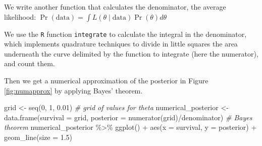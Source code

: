 \documentclass[
  12pt,
]{krantz}
\newenvironment{Shaded}{\begin{snugshade}}{\end{snugshade}}
\newcommand{\AttributeTok}[1]{\textcolor[rgb]{0.77,0.63,0.00}{#1}}
\newcommand{\CommentTok}[1]{\textcolor[rgb]{0.56,0.35,0.01}{\textit{#1}}}
\newcommand{\DecValTok}[1]{\textcolor[rgb]{0.00,0.00,0.81}{#1}}
\newcommand{\FloatTok}[1]{\textcolor[rgb]{0.00,0.00,0.81}{#1}}
\newcommand{\FunctionTok}[1]{\textcolor[rgb]{0.00,0.00,0.00}{#1}}
\newcommand{\NormalTok}[1]{#1}
\newcommand{\OtherTok}[1]{\textcolor[rgb]{0.56,0.35,0.01}{#1}}
\newcommand{\SpecialCharTok}[1]{\textcolor[rgb]{0.00,0.00,0.00}{#1}}
\begin{document}
We write another function that calculates the denominator, the average likelihood: \(\Pr(\text{data}) = \int{L(\theta \mid \text{data}) \Pr(\theta) d\theta}\)

\begin{Shaded}
\end{Shaded}

We use the \texttt{R} function \texttt{integrate} to calculate the integral in the denominator, which implements quadrature techniques to divide in little squares the area underneath the curve delimited by the function to integrate (here the numerator), and count them.

Then we get a numerical approximation of the posterior in Figure \ref{fig:numapprox} by applying Bayes' theorem.

\begin{Shaded}
\begin{Highlighting}[]
\NormalTok{grid }\OtherTok{\textless{}{-}} \FunctionTok{seq}\NormalTok{(}\DecValTok{0}\NormalTok{, }\DecValTok{1}\NormalTok{, }\FloatTok{0.01}\NormalTok{) }\CommentTok{\# grid of values for theta}
\NormalTok{numerical\_posterior }\OtherTok{\textless{}{-}} \FunctionTok{data.frame}\NormalTok{(}\AttributeTok{survival =}\NormalTok{ grid, }
                                  \AttributeTok{posterior =} \FunctionTok{numerator}\NormalTok{(grid)}\SpecialCharTok{/}\NormalTok{denominator) }\CommentTok{\# Bayes\textquotesingle{} theorem}
\NormalTok{numerical\_posterior }\SpecialCharTok{\%\textgreater{}\%}
  \FunctionTok{ggplot}\NormalTok{() }\SpecialCharTok{+}
  \FunctionTok{aes}\NormalTok{(}\AttributeTok{x =}\NormalTok{ survival, }\AttributeTok{y =}\NormalTok{ posterior) }\SpecialCharTok{+} 
  \FunctionTok{geom\_line}\NormalTok{(}\AttributeTok{size =} \FloatTok{1.5}\NormalTok{)}
\end{Highlighting}
\end{Shaded}
\end{document}
